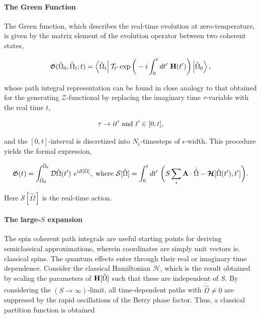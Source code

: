 \documentclass{homework}
\begin{document}
\paragraph{The Green Function}

The Green function, which describes the real-time evolution at zero-temperature, is given by the matrix element of the evolution operator between two coherent states, 

\begin{equation}
    \mathfrak{G}(\hat{\Omega}_0, \hat{\Omega}_t; t) = \bra{\hat{\Omega}_t} \mathcal{T}_{t'} \exp \bigg(-i \int_{0}^{t} dt' \textnormal{ } {\bf H}(t')\bigg) \ket{\hat{\Omega}_0},
\end{equation}

whose path integral representation can be found in close analogy to that obtained for the generating $\mathcal{Z}$-functional by replacing the imaginary time $\tau$-variable with the real time $t$,

\begin{equation*}
    \tau \rightarrow it' \textnormal{ and } t' \in [0,t],
\end{equation*}

and the $[0,t]$-interval is discretized into $N_{\epsilon}$-timesteps of $\epsilon$-width. This procedure yields the formal expression, 

\begin{equation}
    \mathfrak{G}(t) = \int_{\hat{\Omega}_0}^{\hat{\Omega}_t} \mathcal{D} \hat{\Omega}(t') \textnormal{ } e^{i \mathcal{S}[\hat{\Omega}]}, \textnormal{ where } \mathcal{S}[\hat{\Omega}] = \int_{0}^{t} dt' \textnormal{ } \bigg(S \sum_{i} {\bf A} \cdot \dot{\hat{\Omega}} - \bm{\mathcal{H}}[\hat{\Omega}(t'), t'] \bigg).
\end{equation}

Here $\mathcal{S}[\hat{\Omega}]$ is the real-time action. \\

\paragraph{The large-$S$ expansion} 

The spin coherent path integrals are useful starting points for deriving semiclassical approximations, wherein coordinates are simply unit vectors ie. classical spins. The quantum effects enter through their real or imaginary time dependence. Consider the classical Hamiltonian $\bm{\mathcal{H}}$, which is the result obtained by scaling the parameters of ${\bf H}[\hat{\Omega}]$ such that these are independent of $S$. By considering the $(S \rightarrow \infty)$-limit, all time-dependent paths with $\dot{\hat{\Omega}} \neq 0$ are suppresed by the rapid oscillations of the Berry phase factor. Thus, a classical partition function is obtained 
\end{document}
